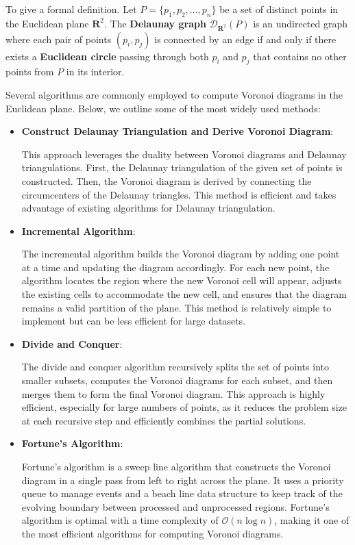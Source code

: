 \documentclass[minted, draw]{hebdomon}
\begin{document}
To give a formal definition. Let \( P = \{p_1, p_2, \ldots, p_n\} \) be a set of distinct points in the Euclidean plane \( \mathbf{R}^2 \). The \textbf{Delaunay graph} \( \mathcal{D}_{\mathbf{R}^2}(P) \) is an undirected graph where each pair of points \( (p_i, p_j) \) is connected by an edge if and only if there exists a \textbf{Euclidean circle} passing through both \( p_i \) and \( p_j \) that contains no other points from \( P \) in its interior.


Several algorithms are commonly employed to compute Voronoi diagrams in the Euclidean plane. Below, we outline some of the most widely used methods:

\begin{itemize}
    \item \textbf{Construct Delaunay Triangulation and Derive Voronoi Diagram}:
    
    This approach leverages the duality between Voronoi diagrams and Delaunay triangulations. First, the Delaunay triangulation of the given set of points is constructed. Then, the Voronoi diagram is derived by connecting the circumcenters of the Delaunay triangles. This method is efficient and takes advantage of existing algorithms for Delaunay triangulation.
    
    \item \textbf{Incremental Algorithm}:
    
    The incremental algorithm builds the Voronoi diagram by adding one point at a time and updating the diagram accordingly. For each new point, the algorithm locates the region where the new Voronoi cell will appear, adjusts the existing cells to accommodate the new cell, and ensures that the diagram remains a valid partition of the plane. This method is relatively simple to implement but can be less efficient for large datasets.
    
    \item \textbf{Divide and Conquer}:
    
    The divide and conquer algorithm recursively splits the set of points into smaller subsets, computes the Voronoi diagrams for each subset, and then merges them to form the final Voronoi diagram. This approach is highly efficient, especially for large numbers of points, as it reduces the problem size at each recursive step and efficiently combines the partial solutions.
    
    \item \textbf{Fortune's Algorithm}:
    
    Fortune's algorithm is a sweep line algorithm that constructs the Voronoi diagram in a single pass from left to right across the plane. It uses a priority queue to manage events and a beach line data structure to keep track of the evolving boundary between processed and unprocessed regions. Fortune's algorithm is optimal with a time complexity of $\mathcal{O}(n \log n)$, making it one of the most efficient algorithms for computing Voronoi diagrams.
\end{itemize}
\end{document}
